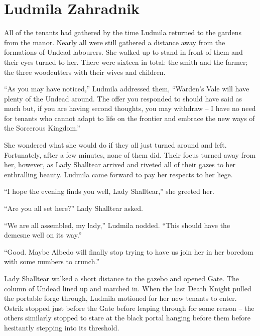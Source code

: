 \chapter{Ludmila Zahradnik}

All of the tenants had gathered by the time Ludmila returned to the gardens from the manor. Nearly all were still gathered a distance away from the formations of Undead labourers. She walked up to stand in front of them and their eyes turned to her. There were sixteen in total: the smith and the farmer; the three woodcutters with their wives and children.

 

“As you may have noticed,” Ludmila addressed them, “Warden’s Vale will have plenty of the Undead around. The offer you responded to should have said as much but, if you are having second thoughts, you may withdraw – I have no need for tenants who cannot adapt to life on the frontier and embrace the new ways of the Sorcerous Kingdom.”

 

She wondered what she would do if they all just turned around and left. Fortunately, after a few minutes, none of them did. Their focus turned away from her, however, as Lady Shalltear arrived and riveted all of their gazes to her enthralling beauty. Ludmila came forward to pay her respects to her liege.

 

“I hope the evening finds you well, Lady Shalltear,” she greeted her.

 

“Are you all set here?” Lady Shalltear asked.

 

“We are all assembled, my lady,” Ludmila nodded. “This should have the demesne well on its way.”

 

“Good. Maybe Albedo will finally stop trying to have us join her in her boredom with some numbers to crunch.”

 

Lady Shalltear walked a short distance to the gazebo and opened Gate. The column of Undead lined up and marched in. When the last Death Knight pulled the portable forge through, Ludmila motioned for her new tenants to enter. Ostrik stopped just before the Gate before leaping through for some reason – the others similarly stopped to stare at the black portal hanging before them before hesitantly stepping into its threshold.

